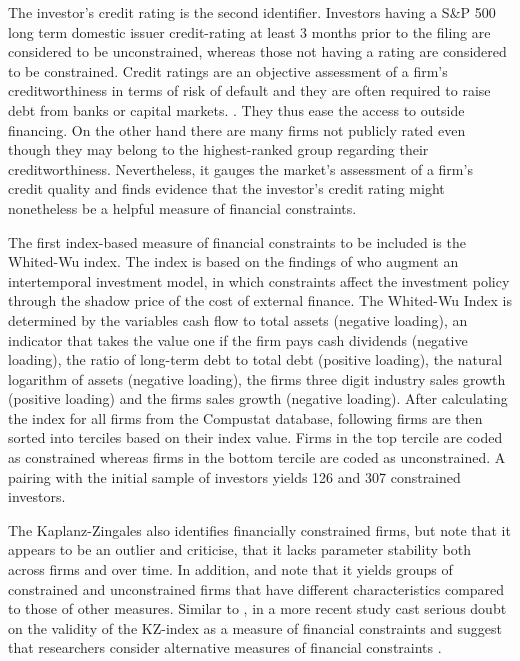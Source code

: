 \documentclass[12pt]{article}
\begin{document}
The investor's credit rating is the second identifier. Investors having a S\&P 500 long term domestic issuer credit-rating at least 3 months prior to the filing are considered to be unconstrained, whereas those not having a rating are considered to be constrained. Credit ratings are an objective assessment of a firm's creditworthiness in terms of risk of default and they are often required to raise debt from banks or capital markets. \citep[p.18]{heller2015}. They thus ease the access to outside financing. On the other hand there are many firms not publicly rated even though they may belong to the highest-ranked group regarding their creditworthiness. Nevertheless, it gauges the market's assessment of a firm's credit quality \citep[p.1790]{Almeida2004} and \citet[p.175]{heller2015} finds evidence that the investor's credit rating might nonetheless be a helpful measure of financial constraints.\par
The first index-based measure of financial constraints to be included is the Whited-Wu index. The index is based on the findings of \citet[p.543]{Whited2006} who augment an intertemporal investment model, in which constraints affect the investment policy through the shadow price of the cost of external finance. The Whited-Wu Index is determined by the variables cash flow to total assets (negative loading), an indicator that takes the value one if the firm pays cash dividends (negative loading), the ratio of long-term debt to total debt (positive loading), the natural logarithm of assets (negative loading), the firms three digit industry sales growth (positive loading) and the firms sales growth (negative loading). After calculating the index for all firms from the Compustat database, following \citet[p.38]{Farre-mensa2013} firms are then sorted into terciles based on their index value. Firms in the top tercile are coded as constrained whereas firms in the bottom tercile are coded as unconstrained. A pairing with the initial sample of investors yields 126 and 307 constrained investors.\par
The Kaplanz-Zingales also identifies financially constrained firms, but \citet[p.29]{Farre-mensa2013} note that it appears to be an outlier and \citet{Whited2006} criticise, that it lacks parameter stability both across firms and over time. In addition, \citet[p.111]{Khatami2014} and \citet[p.1779]{Almeida2004} note that it yields groups of constrained and unconstrained firms that have different characteristics compared to those of other measures. Similar to \citet[p.546]{Whited2006}, in a more recent study \citet[p.1909]{hadlock2010} cast serious doubt on the validity of the KZ-index as a measure of financial constraints and suggest that researchers consider alternative measures of financial constraints \citep[p.1938]{hadlock2010}.\par
\end{document}
